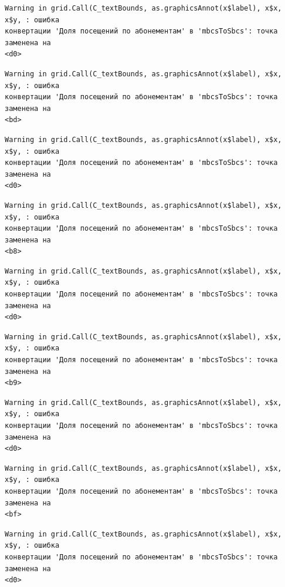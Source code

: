 \documentclass[
  letterpaper,
  DIV=11,
  numbers=noendperiod]{scrreprt}
\begin{document}
\begin{verbatim}
Warning in grid.Call(C_textBounds, as.graphicsAnnot(x$label), x$x, x$y, : ошибка
конвертации 'Доля посещений по абонементам' в 'mbcsToSbcs': точка заменена на
<d0>
\end{verbatim}

\begin{verbatim}
Warning in grid.Call(C_textBounds, as.graphicsAnnot(x$label), x$x, x$y, : ошибка
конвертации 'Доля посещений по абонементам' в 'mbcsToSbcs': точка заменена на
<bd>
\end{verbatim}

\begin{verbatim}
Warning in grid.Call(C_textBounds, as.graphicsAnnot(x$label), x$x, x$y, : ошибка
конвертации 'Доля посещений по абонементам' в 'mbcsToSbcs': точка заменена на
<d0>
\end{verbatim}

\begin{verbatim}
Warning in grid.Call(C_textBounds, as.graphicsAnnot(x$label), x$x, x$y, : ошибка
конвертации 'Доля посещений по абонементам' в 'mbcsToSbcs': точка заменена на
<b8>
\end{verbatim}

\begin{verbatim}
Warning in grid.Call(C_textBounds, as.graphicsAnnot(x$label), x$x, x$y, : ошибка
конвертации 'Доля посещений по абонементам' в 'mbcsToSbcs': точка заменена на
<d0>
\end{verbatim}

\begin{verbatim}
Warning in grid.Call(C_textBounds, as.graphicsAnnot(x$label), x$x, x$y, : ошибка
конвертации 'Доля посещений по абонементам' в 'mbcsToSbcs': точка заменена на
<b9>
\end{verbatim}

\begin{verbatim}
Warning in grid.Call(C_textBounds, as.graphicsAnnot(x$label), x$x, x$y, : ошибка
конвертации 'Доля посещений по абонементам' в 'mbcsToSbcs': точка заменена на
<d0>
\end{verbatim}

\begin{verbatim}
Warning in grid.Call(C_textBounds, as.graphicsAnnot(x$label), x$x, x$y, : ошибка
конвертации 'Доля посещений по абонементам' в 'mbcsToSbcs': точка заменена на
<bf>
\end{verbatim}

\begin{verbatim}
Warning in grid.Call(C_textBounds, as.graphicsAnnot(x$label), x$x, x$y, : ошибка
конвертации 'Доля посещений по абонементам' в 'mbcsToSbcs': точка заменена на
<d0>
\end{verbatim}
\end{document}
